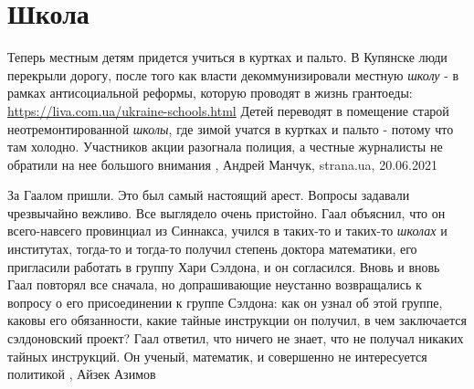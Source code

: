  
 
 
 
 
\chapter{Школа}
\label{sec:slova.shkola}

Теперь местным детям придется учиться в куртках и пальто. В Купянске люди
перекрыли дорогу, после того как власти декоммунизировали местную \emph{школу}
- в рамках антисоциальной реформы, которую проводят в жизнь грантоеды:
\url{https://liva.com.ua/ukraine-schools.html} Детей переводят в помещение
старой неотремонтированной \emph{школы}, где зимой учатся в куртках и пальто -
потому что там холодно. Участников акции разогнала полиция, а честные
журналисты не обратили на нее большого внимания
, 
Андрей Манчук, strana.ua, 20.06.2021

За Гаалом пришли. Это был самый настоящий арест. Вопросы задавали чрезвычайно
вежливо. Все выглядело очень пристойно. Гаал объяснил, что он всего-навсего
провинциал из Синнакса, учился в таких-то и таких-то \emph{школах} и
институтах, тогда-то и тогда-то получил степень доктора математики, его
пригласили работать в группу Хари Сэлдона, и он согласился. Вновь и вновь Гаал
повторял все сначала, но допрашивающие неустанно возвращались к вопросу о его
присоединении к группе Сэлдона: как он узнал об этой группе, каковы его
обязанности, какие тайные инструкции он получил, в чем заключается сэлдоновский
проект?  Гаал ответил, что ничего не знает, что не получал никаких тайных
инструкций. Он ученый, математик, и совершенно не интересуется политикой
, Айзек Азимов
